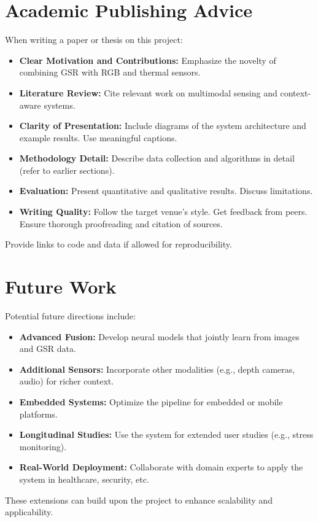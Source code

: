 \documentclass{article}
\begin{document}
    \section{Academic Publishing Advice}

    When writing a paper or thesis on this project:
    \begin{itemize}
        \item \textbf{Clear Motivation and Contributions:} Emphasize the novelty of combining GSR with RGB and thermal sensors.
        \item \textbf{Literature Review:} Cite relevant work on multimodal sensing and context-aware systems.
        \item \textbf{Clarity of Presentation:} Include diagrams of the system architecture and example results. Use meaningful captions.
        \item \textbf{Methodology Detail:} Describe data collection and algorithms in detail~\cite{RefMethodology} (refer to earlier sections).
        \item \textbf{Evaluation:} Present quantitative and qualitative results. Discuss limitations.
        \item \textbf{Writing Quality:} Follow the target venue’s style. Get feedback from peers. Ensure thorough proofreading and citation of sources.
    \end{itemize}
    Provide links to code and data if allowed for reproducibility.


    \section{Future Work}

    Potential future directions include:
    \begin{itemize}
        \item \textbf{Advanced Fusion:} Develop neural models that jointly learn from images and GSR data.
        \item \textbf{Additional Sensors:} Incorporate other modalities (e.g., depth cameras, audio) for richer context.
        \item \textbf{Embedded Systems:} Optimize the pipeline for embedded or mobile platforms.
        \item \textbf{Longitudinal Studies:} Use the system for extended user studies (e.g., stress monitoring).
        \item \textbf{Real-World Deployment:} Collaborate with domain experts to apply the system in healthcare, security, etc.
    \end{itemize}
    These extensions can build upon the project to enhance scalability and applicability.
\end{document}
